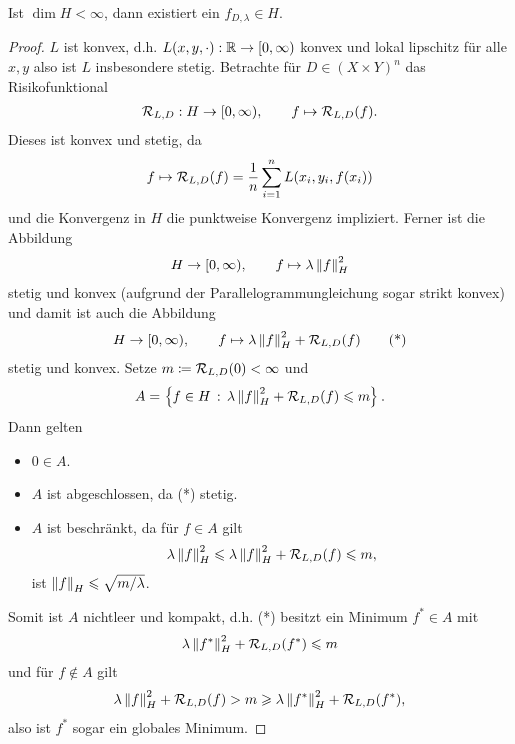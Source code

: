 \begin{prop}
\label{prop:6.1.3}
Ist $\dim H < \infty$, dann existiert ein $f_{D,\lambda}\in H$.\fishhere
\end{prop}
\begin{proof}
$L$ ist konvex, d.h. $L(x,y,\cdot): \mathbb{R}\to [0,\infty)$ konvex und lokal lipschitz
für alle $x,y$ also ist $L$ insbesondere stetig. Betrachte für $D\in (X\times
Y)^n$ das Risikofunktional
\begin{align*}
\mathcal{R}_{L,D} : H\to [0,\infty),\qquad f\mapsto \mathcal{R}_{L,D}(f).
\end{align*}
Dieses ist konvex und stetig, da
\begin{align*}
f\mapsto \mathcal{R}_{L,D}(f) = \frac{1}{n}\sum_{i=1}^n L(x_i,y_i,f(x_i))
\end{align*}
und die Konvergenz in $H$ die punktweise Konvergenz impliziert. Ferner ist die
Abbildung
\begin{align*}
H\to [0,\infty),\qquad f\mapsto \lambda \left\|f\right\|_H^2 
\end{align*}
stetig und konvex (aufgrund der Parallelogrammungleichung sogar strikt konvex)
und damit ist auch die Abbildung
\begin{align*}
H\to [0,\infty),\qquad f\mapsto \lambda \left\|f\right\|_H^2 + \mathcal{R}_{L,D}(f)\tag{*}
\end{align*}
stetig und konvex. Setze $m\coloneq\mathcal{R}_{L,D}(0) < \infty$ und
\begin{align*}
A =\left\{ f\in H\,:\,\lambda\left\|f\right\|_H^2 + \mathcal{R}_{L,D}(f)\leqslant m\right\}.
\end{align*}
Dann gelten
\begin{itemize}
  \item $0\in A$.
  \item $A$ ist abgeschlossen, da (*) stetig.
  \item $A$ ist beschränkt, da für $f\in A$ gilt
\begin{align*}
\lambda\left\|f\right\|_H^2 \leqslant \lambda \left\|f\right\|_H^2 + \mathcal{R}_{L,D}(f) \leqslant m,
\end{align*} 
ist $\left\|f\right\|_H \leqslant \sqrt{m/\lambda}$.
\end{itemize}
Somit ist $A$ nichtleer und kompakt, d.h. (*) besitzt ein Minimum $f^*\in A$ mit
\begin{align*}
\lambda\left\|f^*\right\|_H^2 + \mathcal{R}_{L,D}(f^*)\leqslant m
\end{align*}
und für $f\notin A$ gilt
\begin{align*}
\lambda\left\|f\right\|_H^2 + \mathcal{R}_{L,D}(f) > m \geqslant
\lambda\left\|f^*\right\|_H^2 + \mathcal{R}_{L,D}(f^*),
\end{align*}
also ist $f^*$ sogar ein globales Minimum.\qedhere
\end{proof}

